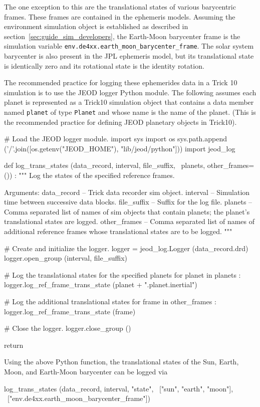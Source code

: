 The one exception to this are the translational states of various
barycentric frames. These frames are contained in the ephemeris models.
Assuming the environment simulation object is established as described
in section~\ref{sec:guide_sim_developers}, the Earth-Moon barycenter
frame is the simulation variable
\verb|env.de4xx.earth_moon_barycenter_frame|.
The solar system barycenter is also present in the JPL ephemeris model,
but its translational state is identically zero and its rotational
state is the identity rotation.

The recommended practice for logging these ephemerides data
in a Trick 10 simulation is to use the JEOD logger Python module.
The following assumes each planet is represented as a Trick10 simulation object
that contains a data member named \verb|planet| of type \verb|Planet|
and whose name is the name of the planet. (This is the recommended
practice for defining JEOD planetary objects in Trick10).
\begin{codeblock}
# Load the JEOD logger module.
import sys 
import os
sys.path.append ('/'.join([os.getenv("JEOD_HOME"), "lib/jeod/python"]))
import jeod_log

def log_trans_states (data_record, interval, file_suffix, \
                      planets, other_frames=()) :
  """
  Log the states of the specified reference frames.

  Arguments:
  data_record -- Trick data recorder sim object.
  interval    -- Simulation time between successive data blocks.
  file_suffix -- Suffix for the log file.
  planets     -- Comma separated list of names of sim objects that
  contain planets; the planet's translational states are logged.
  other_frames -- Comma separated list of names of additional reference
  frames whose translational states are to be logged.
  """

  # Create and initialize the logger.
  logger = jeod_log.Logger (data_record.drd)
  logger.open_group (interval, file_suffix)

  # Log the translational states for the specified planets
  for planet in planets :
     logger.log_ref_frame_trans_state (planet + ".planet.inertial")

  # Log the additional translational states
  for frame in other_frames :
    logger.log_ref_frame_trans_state (frame)

  # Close the logger.
  logger.close_group ()

  return
\end{codeblock}
Using the above Python function, the translational states of the
Sun, Earth, Moon, and Earth-Moon barycenter can be logged via
\begin{codeblock}
log_trans_states (data_record, interval, "state", \
                  ["sun", "earth", "moon"], \
                  ["env.de4xx.earth_moon_barycenter_frame"])
\end{codeblock}


